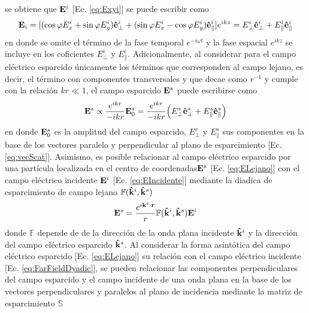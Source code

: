 
\noindent se obtiene que $\vb{E}^i$ [Ec. \eqref{eq:Exyi}] se puede escribir como
\begin{align}
\vb{E}_i = [(\cos\varphi E_{x}^i + \sin\varphi E_{y}^i)\vu{e}_{\perp}^i +
			 (\sin\varphi E_{x}^i - \cos\varphi E_{y}^i)\vu{e}_{\parallel}^i]
			 e^{ikz}
			 = E_{\perp}^i  \vu{e}_{\perp}^i + E_{\parallel}^i\vu{e}_{\parallel}^i
		\label{eq:EIncidente}
\end{align}
en donde se omite el término de la fase temporal $e^{-i\omega t}$ y la fase espacial $e^{ikz}$ se incluye en los coficientes $E_\perp^i$ y $E_\parallel^i$. Adicionalmente, al considerar para el campo eléctrico esparcido  únicamente los términos que corresponden al campo lejano, es decir, el término con componentes transversales y que decae como $r^{-1}$ y cumple con la relación $kr\ll 1$, el campo esparcido $\vb{E}^s$ puede escribirse como \cite{bohren1998absorption}
	\begin{align}
	\vb{E}^s \propto \frac{e^{ikr}}{-ikr}\vb{E}_0^s 
			=  \frac{e^{ikr}}{-ikr}
			\qty( E_{\perp}^s  \vu{e}_{\perp}^s + E_{\parallel}^s \vu{e}_{\parallel}^s) \label{eq:ELejano}
	\end{align}
en donde  $\vb{E}_0^s$ es la amplitud del campo esparcido,  $ E_{\perp}^s$ y  $ E_{\parallel}^s$ sus componentes en la base de los vectores paralelo y perpendicular al plano de esparcimiento [Ec. \eqref{eq:vecScat}]. Asimismo, es posible relacionar al campo eléctrico esparcido por una partícula localizada en el centro de coordenadas$\vb{E}^s$ [Ec. \eqref{eq:ELejano}] con el  campo eléctrico incidente $\vb{E}^i$ [Ec. \eqref{eq:EIncidente}]  mediante  la diadica de esparcimiento de campo lejano  $\mathbb{F}(\vu{k}^i,\vu{k}^s)$ \cite{tsang2000scattering}
	\begin{align}
	\vb{E}^s = \frac{e^{i\vb{k}^s\cdot\vb{r}}}{r}\mathbb{F}(\vu{k}^i,\vu{k}^s)\vb{E}^i
	\label{eq:FarFieldDyadic}
	\end{align}
donde $\mathbb{F}$ depende de de la dirección de la onda plana incidente $\vu{k}^i$ y la dirección del campo eléctrico esparcido $\vu{k}^s$. Al considerar la forma asintótica del campo eléctrico esparcido [Ec. \eqref{eq:ELejano}] su relación con el campo eléctrico incidente [Ec. \eqref{eq:FarFieldDyadic}], se pueden relacionar las componentes perpendiculares del campo esparcido y el campo incidente de una onda plana en la base de los vectores perpendiculares y paralelos al plano de incidencia mediante la matriz de esparcimiento $\mathbb{S}$ \cite{bohren1998absorption}
